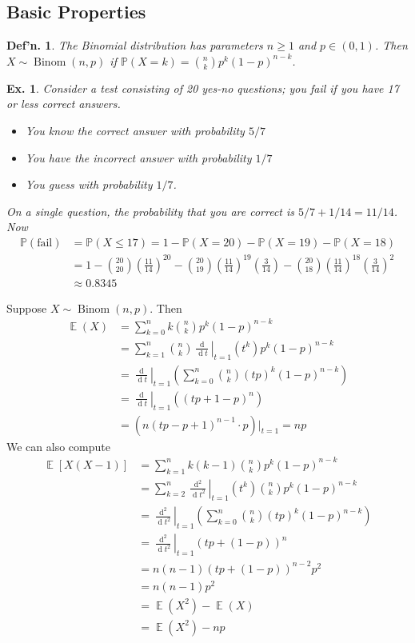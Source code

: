 \documentclass[12pt, a4paper]{book}
\DeclareMathOperator{\E}{\mathbb{E}}
\DeclareMathOperator{\Binom}{Binom}
\renewcommand{\Pr}{\mathbb{P}}
\renewcommand{\d}[1]{\ensuremath{\operatorname{d}\!{#1}}} %
\newtheorem{definition}[theorem]{Def'n.}
\newtheorem{example}[theorem]{Ex.}
\theoremstyle{nonumberplain}
\begin{document}
\subsection{Basic Properties}
\begin{definition}
    The Binomial distribution has parameters $n\geq 1$ and $p\in(0,1)$.
    Then $X\sim\Binom(n,p)$ if $\Pr(X=k)=\binom{n}{k}p^k(1-p)^{n-k}$.
\end{definition}
\begin{example}
    Consider a test consisting of 20 yes-no questions; you fail if you have 17 or less correct answers.
    \begin{itemize}
        \item You know the correct answer with probability $5/7$
        \item You have the incorrect answer with probability $1/7$
        \item You guess with probability $1/7$.
    \end{itemize}
    On a single question, the probability that you are correct is $5/7+1/14=11/14$.
    Now
    \begin{align*}
        \Pr(\text{fail}) &= \Pr(X\leq 17) = 1-\Pr(X=20)-\Pr(X=19)-\Pr(X=18)\\
                         &= 1-\binom{20}{20}\left(\frac{11}{14}\right)^{20}-\binom{20}{19}\left(\frac{11}{14}\right)^{19}\left(\frac{3}{14}\right)-\binom{20}{18}\left(\frac{11}{14}\right)^{18}\left(\frac{3}{14}\right)^2\\
                         &\approx 0.8345
    \end{align*}
\end{example}
Suppose $X\sim\Binom(n,p)$.
Then
\begin{align*}
    \E(X) &= \sum\limits_{k=0}^nk\binom{n}{k}p^k(1-p)^{n-k}\\
          &= \sum\limits_{k=1}^n\binom{n}{k}\left.\frac{\d{}}{\d{t}}\right\rvert_{t=1}(t^k)p^k(1-p)^{n-k}\\
          &= \left.\frac{\d{}}{\d{t}}\right\rvert_{t=1}\left(\sum\limits_{k=0}^n\binom{n}{k}(tp)^k(1-p)^{n-k}\right)\\
          &= \left.\frac{\d{}}{\d{t}}\right\rvert_{t=1}\left((tp+1-p)^n\right)\\
          &= \left.\left(n(tp-p+1)^{n-1}\cdot p\right)\rvert_{t=1}=np
\end{align*}
We can also compute
\begin{align*}
    \E[X(X-1)] &= \sum\limits_{k=1}^n k(k-1)\binom{n}{k}p^k(1-p)^{n-k}\\
               &= \sum\limits_{k=2}^n\left.\frac{\d{}^2}{\d{t^2}}\right\rvert_{t=1}(t^k)\binom{n}{k}p^k(1-p)^{n-k}\\
               &=\left.\frac{\d{}^2}{\d{t^2}}\right\rvert_{t=1}\left(\sum\limits_{k=0}^n\binom{n}{k}(tp)^k(1-p)^{n-k}\right)\\
               &= \left.\frac{\d{}^2}{\d{t^2}}\right\rvert_{t=1}(tp+(1-p))^n\\
               &= n(n-1)(tp+(1-p))^{n-2}p^2\\
               &= n(n-1)p^2\\
               &= \E(X^2)-\E(X)\\
               &= \E(X^2)-np
\end{align*}
\end{document}
